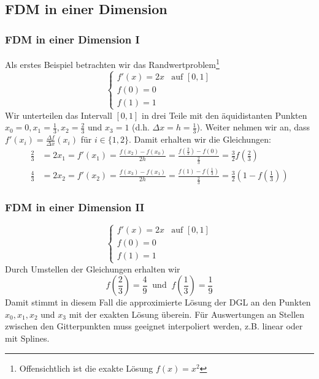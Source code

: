 \subsection{FDM in einer Dimension}
%
\begin{frame}\frametitle{FDM in einer Dimension I}
Als erstes Beispiel betrachten wir das Randwertproblem\footnote{Offensichtlich ist die exakte Lösung $f(x)=x^2$}
$$
\begin{cases}f'(x)=2x & \text{auf } [0,1] \\ f(0)=0 \\ f(1)=1 \end{cases}
$$
Wir unterteilen das Intervall $[0,1]$ in drei Teile mit den äquidistanten Punkten $x_0=0, x_1=\frac{1}{3}, x_2=\frac{2}{3}$ und $x_3=1$ (d.h. $\Delta x=h=\frac{1}{3}$). Weiter nehmen wir an, dass $f'(x_i) =\frac{\Delta f}{\Delta x}(x_i)$ für $i \in \{1,2\}$.  Damit erhalten wir die Gleichungen:
\begin{align*}
\frac{2}{3}&=2x_1=f'(x_1)=\frac{f(x_2)-f(x_0)}{2h}=\frac{f(\frac{2}{3})-f(0)}{\frac{2}{3}}=\frac{3}{2}f(\frac{2}{3})\\
\frac{4}{3}&=2x_2=f'(x_2)=\frac{f(x_3)-f(x_1)}{2h}=\frac{f(1)-f(\frac{1}{3})}{\frac{2}{3}}=\frac{3}{2}(1-f(\frac{1}{3}))
\end{align*}
\end{frame}
%
%
\begin{frame}\frametitle{FDM in einer Dimension II}
$$
\begin{cases}f'(x)=2x & \text{auf } [0,1] \\ f(0)=0 \\ f(1)=1 \end{cases}
$$\vfill
Durch Umstellen der Gleichungen erhalten wir
$$
f(\frac{2}{3})=\frac{4}{9} \ \text{ und }\ f(\frac{1}{3})=\frac{1}{9}
$$	 \vfill
Damit stimmt in diesem Fall die approximierte Lösung der DGL an den Punkten $x_0,x_1,x_2$ und $x_3$ mit der exakten Lösung überein. Für Auswertungen an Stellen zwischen den Gitterpunkten muss geeignet interpoliert werden, z.B. linear oder mit Splines.	
\end{frame}
%
%
